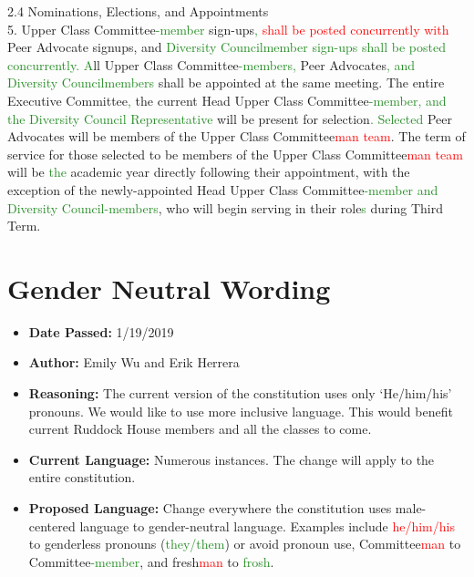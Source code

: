 \documentclass[10pt]{article} %
\begin{document}
\begin{itemize}
	2.4 Nominations, Elections, and Appointments \\
	5. Upper Class Committee\textcolor{ForestGreen}{-member} sign-ups\textcolor{ForestGreen}{,} \textcolor{red}{shall be posted concurrently with} Peer Advocate signups, and \textcolor{ForestGreen}{Diversity Councilmember sign-ups shall be posted concurrently. A}ll Upper Class Committee\textcolor{ForestGreen}{-members, } Peer Advocates\textcolor{ForestGreen}{, and Diversity Councilmembers} shall be appointed at the same meeting. The entire Executive Committee\textcolor{ForestGreen}{,} the current Head Upper Class Committee\textcolor{ForestGreen}{-member, and the Diversity Council Representative} will be present for selection\textcolor{ForestGreen}{. Selected} Peer Advocates will be members of the Upper Class Committee\textcolor{red}{man team}. The term of service for those selected to be members of the Upper Class Committee\textcolor{red}{man team} will be \textcolor{ForestGreen}{the} academic year directly following their appointment, with the exception of the newly-appointed Head Upper Class Committee\textcolor{ForestGreen}{-member and Diversity Council-members}, who will begin serving in their role\textcolor{ForestGreen}{s} during Third Term.
\end{itemize}

\section{Gender Neutral Wording}
\begin{itemize}
	\item \textbf{Date Passed:} 1/19/2019
	\item \textbf{Author:} Emily Wu and Erik Herrera
	\item \textbf{Reasoning:} The current version of the constitution uses only ‘He/him/his' pronouns. We would like to use more inclusive language. This would benefit current Ruddock House members and all the classes to come. 
	\item \textbf{Current Language:} Numerous instances. The change will apply to the entire constitution.
	\item \textbf{Proposed Language:} Change everywhere the constitution uses male-centered language to gender-neutral language. Examples include \textcolor{red}{he/him/his} to genderless pronouns (\textcolor{ForestGreen}{they/them}) or avoid pronoun use, Committee\textcolor{red}{man} to Committee\textcolor{ForestGreen}{-member}, and fresh\textcolor{red}{man} to \textcolor{ForestGreen}{frosh}. 
\end{itemize}
\end{document}
